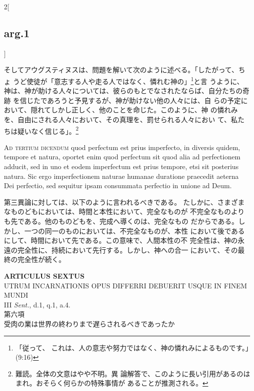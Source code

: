 \documentclass[paper=a4paper,fontsize=10pt,jafontsize=9pt,titlepage]{jlreq}
\begin{document}
\begin{paracol}{2}[\subsection{arg.1}]
\switchcolumn

そしてアウグスティヌスは、問題を解いて次のように述べる。「したがって、ちょ
 うど使徒が「意志する人や走る人ではなく、憐れむ神の」\footnote{「従って、
 これは、人の意志や努力ではなく、神の憐れみによるものです。」(9:16)}と言
 うように、神は、神が助ける人々については、彼らのもとでなされたならば、自分たちの奇跡
 を信じたであろうと予見するが、神が助けない他の人々には、自
 らの予定において、隠れてしかし正しく、他のことを命じた。このように、神
 の憐れみを、自由にされる人々において、その真理を、罰せられる人々におい
 て、私たちは疑いなく信じる」。\footnote{難読。全体の文意はやや不明。異
 論解答で、このように長い引用があるのはまれ。おそらく何らかの特殊事情が
 あることが推測される。}

\switchcolumn*[\subsection{ad.3}]

{\scshape Ad tertium dicendum} quod perfectum est prius
imperfecto, in diversis quidem, tempore et natura, oportet enim quod
perfectum sit quod alia ad perfectionem adducit, sed in uno et eodem
imperfectum est prius tempore, etsi sit posterius natura. Sic ergo
imperfectionem naturae humanae duratione praecedit aeterna Dei
perfectio, sed sequitur ipsam consummata perfectio in unione ad Deum.

\switchcolumn

第三異論に対しては、以下のように言われるべきである。
たしかに、さまざまなものどもにおいては、時間と本性において、完全なものが
 不完全なものよりも先である。他のものどもを、完成へ導くのは、完全なもの
 だからである。しかし、一つの同一のものにおいては、不完全なものが、本性
 において後であるにして、時間において先である。この意味で、人間本性の不
 完全性は、神の永遠の完全性に、持続において先行する。しかし、神への合一
 において、その最終の完全性が続く。

\end{paracol}
\newpage
{}
{}
\setcounter{section}{6}
\setcounter{subsection}{0}





\begin{center}
 {\Large {\bfseries ARTICULUS SEXTUS}}\\
 {\large UTRUM INCARNATIONIS OPUS DIFFERRI DEBUERIT USQUE IN FINEM MUNDI}\\
 {\footnotesize III {\itshape Sent.}, d.1, q.1, a.4.}\\
 {\Large 第六項\\受肉の業は世界の終わりまで遅らされるべきであったか}
\end{center}
\end{document}
